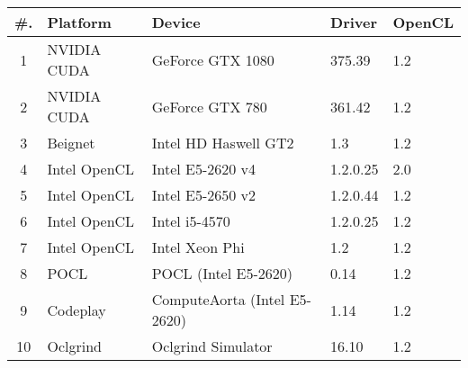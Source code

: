 \begin{tabular}{ | c l l l l | }
	\hline
	\rowcolor{gray!50}
	\textbf{\#. } & \textbf{Platform} & \textbf{Device} & \textbf{Driver} & \textbf{OpenCL} \\
	\hline
	1 & NVIDIA CUDA & GeForce GTX 1080 & 375.39 & 1.2 \\
	2 & NVIDIA CUDA & GeForce GTX 780 & 361.42 & 1.2 \\
	3 & Beignet & Intel HD Haswell GT2 & 1.3 & 1.2 \\
	4 & Intel OpenCL & Intel E5-2620 v4 & 1.2.0.25 & 2.0 \\
	5 & Intel OpenCL & Intel E5-2650 v2 & 1.2.0.44 & 1.2 \\
	6 & Intel OpenCL & Intel i5-4570 & 1.2.0.25 & 1.2 \\
	7 & Intel OpenCL & Intel Xeon Phi & 1.2 & 1.2 \\
	8 & POCL & POCL (Intel E5-2620) & 0.14 & 1.2 \\
	9 & Codeplay & ComputeAorta (Intel E5-2620) & 1.14 & 1.2 \\
	10 & Oclgrind & Oclgrind Simulator & 16.10 & 1.2 \\
	\hline
\end{tabular}
